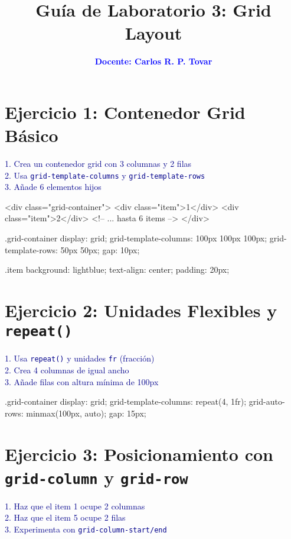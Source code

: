 \documentclass[12pt, a4paper]{article}
\title{\textbf{Guía de Laboratorio 3: Grid Layout}}
\author{\textcolor{blue}{\textbf{Docente: Carlos R. P. Tovar}}}
\date{}
\newcommand{\enunciado}[1]{
    \vspace{0.5em}
    \noindent\colorbox{blue!10}{
        \parbox{\dimexpr\textwidth-2\fboxsep}{
            \small\sffamily\textcolor{darkblue}{#1}
        }
    }
    \vspace{0.5em}
}
\begin{document}
\maketitle
\thispagestyle{empty}


\section*{Ejercicio 1: Contenedor Grid Básico}
\enunciado{
    1. Crea un contenedor grid con 3 columnas y 2 filas \\
    2. Usa \texttt{grid-template-columns} y \texttt{grid-template-rows} \\
    3. Añade 6 elementos hijos
}

\begin{codebox}[title=HTML]
<div class="grid-container">
    <div class="item">1</div>
    <div class="item">2</div>
    <!-- ... hasta 6 items -->
</div>
\end{codebox}

\begin{codebox}[title=CSS]
.grid-container {
    display: grid;
    grid-template-columns: 100px 100px 100px;
    grid-template-rows: 50px 50px;
    gap: 10px;
}

.item {
    background: lightblue;
    text-align: center;
    padding: 20px;
}
\end{codebox}

\section*{Ejercicio 2: Unidades Flexibles y \texttt{repeat()}}
\enunciado{
    1. Usa \texttt{repeat()} y unidades \texttt{fr} (fracción) \\
    2. Crea 4 columnas de igual ancho \\
    3. Añade filas con altura mínima de 100px
}

\begin{codebox}[title=CSS]
.grid-container {
    display: grid;
    grid-template-columns: repeat(4, 1fr);
    grid-auto-rows: minmax(100px, auto);
    gap: 15px;
}
\end{codebox}

\section*{Ejercicio 3: Posicionamiento con \texttt{grid-column} y \texttt{grid-row}}
\enunciado{
    1. Haz que el item 1 ocupe 2 columnas \\
    2. Haz que el item 5 ocupe 2 filas \\
    3. Experimenta con \texttt{grid-column-start/end}
}
\end{document}
